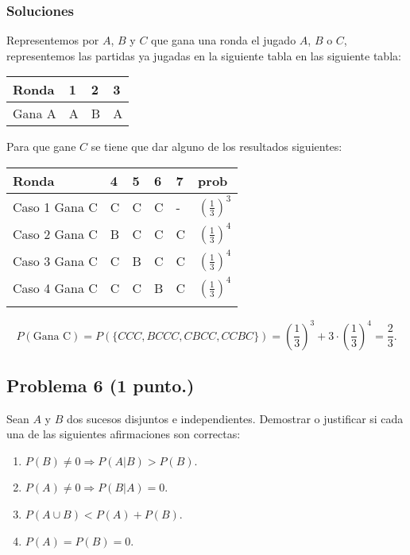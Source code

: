 \documentclass[
]{article}
\providecommand{\tightlist}{%
  \setlength{\itemsep}{0pt}\setlength{\parskip}{0pt}}
\begin{document}
\hypertarget{soluciones}{%
\subsubsection{Soluciones}\label{soluciones}}

Representemos por \(A\), \(B\) y \(C\) que gana una ronda el jugado
\(A\), \(B\) o \(C\), representemos las partidas ya jugadas en la
siguiente tabla en las siguiente tabla:

\begin{tabular}{|l||l|l|l|}
\hline
Ronda & 1 & 2 & 3\\\hline\hline
Gana A & A & B & A\\ \hline
\end{tabular}

Para que gane \(C\) se tiene que dar alguno de los resultados
siguientes:

\begin{tabular}{|l||l|l|l|l|l|}
\hline
Ronda & 4 & 5 & 6 & 7 & prob \\\hline\hline
Caso 1 Gana C & C & C & C & -  & $\left(\frac{1}{3}\right)^3$\\ \hline
Caso 2 Gana C & B & C & C & C  & $\left(\frac{1}{3}\right)^4$\\ \hline
Caso 3 Gana C & C & B & C & C  & $\left(\frac{1}{3}\right)^4$\\ \hline
Caso 4 Gana C & C & C & B & C  & $\left(\frac{1}{3}\right)^4$\\ \hline
\\\hline
\end{tabular}

\[P(\mbox{Gana C})= P(\{CCC,BCCC,CBCC,CCBC\})=
\left(\frac{1}{3}\right)^3 + 3\cdot \left(\frac{1}{3}\right)^4=\frac{2}{3}.\]

\hypertarget{problema-6}{%
\subsection{\texorpdfstring{Problema 6
(\textbf{1 punto.})}{Problema 6 ()}}\label{problema-6}}

Sean \(A\) y \(B\) dos sucesos disjuntos e independientes. Demostrar o
justificar si cada una de las siguientes afirmaciones son correctas:

\begin{enumerate}
\def\labelenumi{\alph{enumi}.}
\tightlist
\item
  \(P(B)\neq 0 \Rightarrow P(A|B)> P(B)\).
\item
  \(P(A)\neq 0 \Rightarrow P(B|A)=0\).
\item
  \(P(A\cup B)< P(A)+P(B)\).
\item
  \(P(A)=P(B)=0\).
\end{enumerate}
\end{document}
